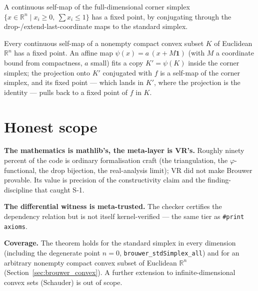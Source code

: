 \begin{theorem}
\label{thm:brouwer_corner}
\leanok
{}
A continuous self-map of the full-dimensional corner simplex
$\{x \in \mathbb{R}^n \mid x_i \ge 0,\ \sum x_i \le 1\}$ has a fixed point, by conjugating through
the drop-/extend-last-coordinate maps to the standard simplex.
\end{theorem}

\begin{theorem}
\label{thm:brouwer_convex}
\leanok
{}
Every continuous self-map of a nonempty compact convex subset $K$ of Euclidean $\mathbb{R}^n$ has a
fixed point. An affine map $\psi(x) = a\,(x + M\mathbf{1})$ (with $M$ a coordinate bound from
compactness, $a$ small) fits a copy $K' = \psi(K)$ inside the corner simplex; the projection onto
$K'$ conjugated with $f$ is a self-map of the corner simplex, and its fixed point — which lands in
$K'$, where the projection is the identity — pulls back to a fixed point of $f$ in $K$.
\end{theorem}

\section{Honest scope}
\label{sec:brouwer_scope}

\textbf{The mathematics is mathlib's, the meta-layer is VR's.}  Roughly ninety percent
of the code is ordinary formalisation craft (the triangulation, the $\varphi$-functional,
the drop bijection, the real-analysis limit); VR did not make Brouwer provable.  Its
value is precision of the constructivity claim and the finding-discipline that caught
S-1.

\textbf{The differential witness is meta-trusted.}  The checker certifies the dependency
relation but is not itself kernel-verified --- the same tier as \texttt{\#print axioms}.

\textbf{Coverage.}  The theorem holds for the standard simplex in every dimension (including the
degenerate point $n=0$, \texttt{brouwer\_stdSimplex\_all}) and for an arbitrary nonempty compact
convex subset of Euclidean $\mathbb{R}^n$ (Section~\ref{sec:brouwer_convex}). A further extension to
infinite-dimensional convex sets (Schauder) is out of scope.

